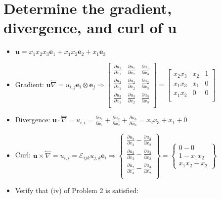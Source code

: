 \documentclass[10pt, letterpaper]{article}
\begin{document}
\section{Determine the gradient, divergence, and curl of $\bm{u}$}
	\begin{itemize}
	\item $ \bm{u} = x_1 x_2 x_3 \bm{e}_1 + x_1 x_2 \bm{e}_2 + x_1 \bm{e}_3$
	\item Gradient: $\bm{u} \overset{\leftharpoonup}{\nabla} = u_{i,j} \bm{e}_i \otimes \bm{e}_j \Rightarrow \begin{bmatrix}
		\frac{\partial u_1}{\partial x_1} & \frac{\partial u_1}{\partial x_2} & \frac{\partial u_1}{\partial x_3} \\ 
		\frac{\partial u_2}{\partial x_1} & \frac{\partial u_2}{\partial x_2} & \frac{\partial u_2}{\partial x_3} \\ 
		\frac{\partial u_3}{\partial x_1} & \frac{\partial u_3}{\partial x_2} & \frac{\partial u_3}{\partial x_3} \\ 
		\end{bmatrix} = 
		\begin{bmatrix}
			x_2 x_3 & x_2 & 1 \\
			x_1 x_3 & x_1 & 0 \\
			x_1 x_2 & 0     & 0 \\
			\end{bmatrix}$
			
	\item Divergence: $\bm{u} \cdot \overset{\leftharpoonup}{\nabla} = u_{i,i} =  
		\frac{\partial u_1}{\partial x_1} + \frac{\partial u_2}{\partial x_2} + \frac{\partial u_3}{\partial x_3} =
		x_2 x_3 + x_1 + 0$
	
	\item Curl: $\bm{u} \times \overset{\leftharpoonup}{\nabla} = u_{i,i} =  \mathcal{E}_{ijk} u_{j,k} \bm{e}_i \Rightarrow
		\begin{Bmatrix}
			\frac{\partial u_2}{\partial x_3} - \frac{\partial u_3}{\partial x_2} \\
			\frac{\partial u_2}{\partial x_3} - \frac{\partial u_3}{\partial x_2} \\
			\frac{\partial u_2}{\partial x_3} - \frac{\partial u_3}{\partial x_2} \\
		\end{Bmatrix} = \begin{Bmatrix}
			0 - 0 \\
			1 - x_1 x_2\\
			x_1 x_2 - x_2
		\end{Bmatrix}$
		
	\item Verify that (iv) of Problem 2 is satisfied:
	
	\end{itemize}
\end{document}
